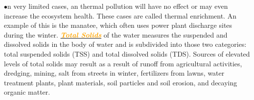 \documentclass{article}
\newcommand{\ddd}{$\bullet$}
\newcommand{\orange}[1]{\textcolor{orange}{#1}}
\newcommand{\mysubsection}[1]{\underline{\textbf{{\textit{\orange{#1}}}}}}
\begin{document}
\begin{multicols*}{4}
            \ddd n very limited cases, an thermal pollution will have no effect or may even increase the ecosystem health. These cases are called thermal enrichment. An example of this is the manatee, which often uses power plant discharge sites during the winter.
        \mysubsection{Total Solids} of the water measures the suspended and dissolved solids in the body of water and is subdivided into those two categories: total suspended solids (TSS) and total dissolved solids (TDS). Sources of elevated levels of total solids may result as a result of runoff from agricultural activities, dredging, mining, salt from streets in winter, fertilizers from lawns, water treatment plants, plant materials, soil particles and soil erosion, and decaying organic matter.
        
\end{multicols*}
\end{document}
